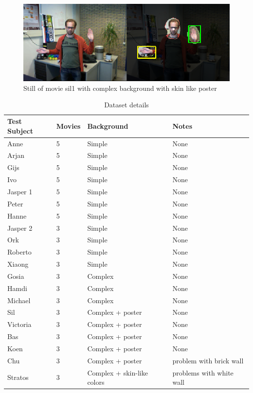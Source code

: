 \begin{figure}[htbp]
\center{}
\includegraphics[width=0.8\linewidth]{figures/complexposter.png}
\caption{Still of movie sil1 with complex background with skin like poster}
\label{fig:complexposterbackground}
\end{figure}


\begin{table}
\centering
\begin{tabular}{llll}
\hline\hline
	Test Subject & Movies & Background & Notes \\
\hline
	Anne     & 5 & Simple & None \\
	Arjan    & 5 & Simple & None \\
	Gijs     & 5 & Simple & None \\
	Ivo      & 5 & Simple & None \\
	Jasper 1 & 5 & Simple & None \\
	Peter    & 5 & Simple & None \\
	Hanne    & 5 & Simple & None \\
	Jasper 2 & 3 & Simple & None \\
	Ork      & 3 & Simple & None \\
	Roberto  & 3 & Simple & None \\
	Xiaong   & 3 & Simple & None \\
	Gosia    & 3 & Complex & None \\
	Hamdi    & 3 & Complex & None \\
	Michael  & 3 & Complex & None \\
	Sil      & 3 & Complex + poster & None \\
	Victoria & 3 & Complex + poster & None \\
	Bas      & 3 & Complex + poster & None \\
	Koen     & 3 & Complex + poster & None \\
	Chu      & 3 & Complex + poster & problem with brick wall \\
	Stratos  & 3 & Complex + skin-like colors & problems with white wall \\
\hline
\end{tabular}
\caption{Dataset details}
\end{table}





